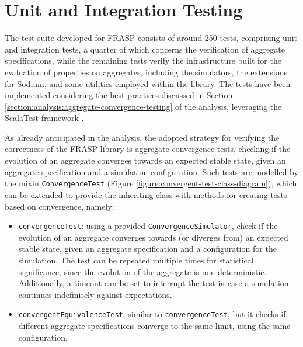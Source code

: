
\section{Unit and Integration Testing}
\label{section:verification:unit-and-integration-testing}

The test suite developed for FRASP consists of around 250 tests, comprising
unit and integration tests, a quarter of which concerns the verification of
aggregate specifications, while the remaining tests verify the infrastructure
built for the evaluation of properties on aggregates, including the simulators,
the extensions for Sodium, and some utilities employed within the library. The
tests have been implemented considering the best practices discussed in Section
\ref{section:analysis:aggregate-convergence-testing} of the analysis,
leveraging the ScalaTest framework \cite{ScalaTest}.

As already anticipated in the analysis, the adopted strategy for verifying the
correctness of the FRASP library is aggregate convergence tests, checking if
the evolution of an aggregate converges towards an expected stable state, given
an aggregate specification and a simulation configuration. Such tests are
modelled by the mixin \texttt{ConvergenceTest} (Figure
\ref{figure:convergent-test-class-diagram}), which can be extended to provide
the inheriting class with methods for creating tests based on convergence,
namely:
\begin{itemize}
  \item \texttt{convergenceTest}: using a provided
        \texttt{ConvergenceSimulator}, check if the evolution of an aggregate
        converges towards (or diverges from) an expected stable state, given an
        aggregate specification and a configuration for the simulation. The
        test can be repeated multiple times for statistical significance, since
        the evolution of the aggregate is non-deterministic. Additionally, a
        timeout can be set to interrupt the test in case a simulation continues
        indefinitely against expectations.
  \item \texttt{convergentEquivalenceTest}: similar to
        \texttt{convergenceTest}, but it checks if different aggregate
        specifications converge to the same limit, using the same
        configuration.
\end{itemize}

